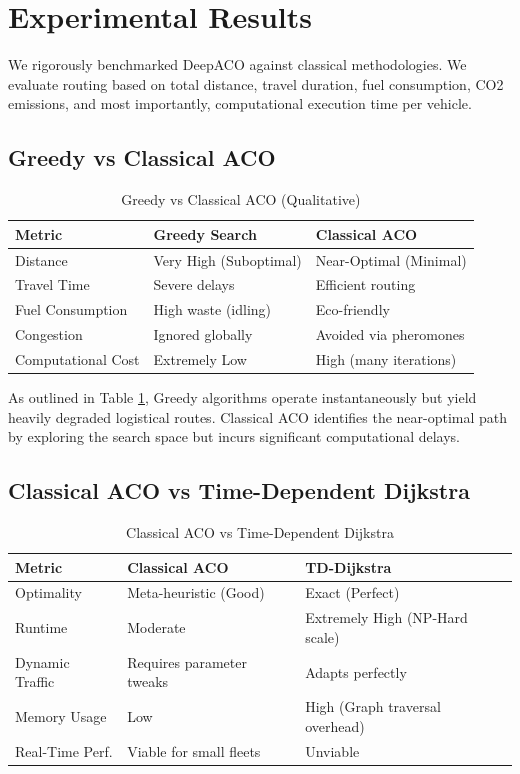 \documentclass[conference]{IEEEtran}
\begin{document}
\section{Experimental Results}
\label{sec:results}

We rigorously benchmarked DeepACO against classical methodologies. We evaluate routing based on total distance, travel duration, fuel consumption, CO2 emissions, and most importantly, computational execution time per vehicle.

\subsection{Greedy vs Classical ACO}

\begin{table}[htbp]
\centering
\caption{Greedy vs Classical ACO (Qualitative)}
\label{tab:greedy_aco}
\begin{tabular}{@{}lll@{}}
\toprule
\textbf{Metric} & \textbf{Greedy Search} & \textbf{Classical ACO} \\ \midrule
Distance & Very High (Suboptimal) & Near-Optimal (Minimal) \\
Travel Time & Severe delays & Efficient routing \\
Fuel Consumption & High waste (idling) & Eco-friendly \\
Congestion & Ignored globally & Avoided via pheromones \\
Computational Cost & Extremely Low & High (many iterations) \\ \bottomrule
\end{tabular}
\end{table}

As outlined in Table \ref{tab:greedy_aco}, Greedy algorithms operate instantaneously but yield heavily degraded logistical routes. Classical ACO identifies the near-optimal path by exploring the search space but incurs significant computational delays.

\subsection{Classical ACO vs Time-Dependent Dijkstra}

\begin{table}[htbp]
\centering
\caption{Classical ACO vs Time-Dependent Dijkstra}
\label{tab:aco_dijkstra}
\begin{tabular}{@{}lll@{}}
\toprule
\textbf{Metric} & \textbf{Classical ACO} & \textbf{TD-Dijkstra} \\ \midrule
Optimality & Meta-heuristic (Good) & Exact (Perfect) \\
Runtime & Moderate & Extremely High (NP-Hard scale) \\
Dynamic Traffic & Requires parameter tweaks & Adapts perfectly \\
Memory Usage & Low & High (Graph traversal overhead) \\
Real-Time Perf. & Viable for small fleets & Unviable \\ \bottomrule
\end{tabular}
\end{table}
\end{document}
